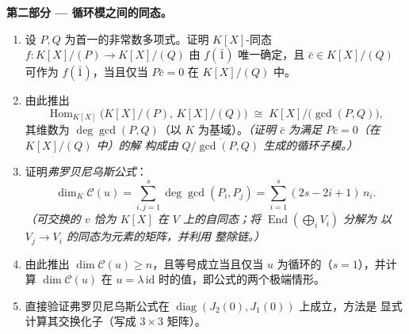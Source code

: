 \begin{problem}
\medskip
\noindent\textbf{第二部分 --- 循环模之间的同态。}
\begin{enumerate}[resume]
  \item 设 $P, Q$ 为首一的非常数多项式。证明
        $K[X]$-同态 $f \colon K[X]/(P) \to K[X]/(Q)$
        由 $f(\bar 1)$ 唯一确定，且 $\bar c \in K[X]/(Q)$
        可作为 $f(\bar 1)$，当且仅当 $P\bar c = 0$ 在 $K[X]/(Q)$ 中。
  \item 由此推出
        \[
        \operatorname{Hom}_{K[X]}\bigl(K[X]/(P),\, K[X]/(Q)\bigr)
        \;\cong\; K[X]\big/\bigl(\gcd(P, Q)\bigr),
        \]
        其维数为 $\deg \gcd(P, Q)$（以 $K$ 为基域）。\emph{（证明
        $\bar c$ 为满足 $P\bar c = 0$（在 $K[X]/(Q)$ 中）的解
        构成由
        $\overline{Q/\gcd(P,Q)}$ 生成的循环子模。）}
  \item 证明\emph{弗罗贝尼乌斯公式}：
        \[
        \dim_K \mathcal C(u) = \sum_{i,j=1}^{s} \deg\gcd(P_i,
        P_j) = \sum_{i=1}^{s} (2s - 2i + 1)\, n_i .
        \]
        \emph{（可交换的 $v$ 恰为 $K[X]$ 在
        $V$ 上的自同态；将 $\operatorname{End}(\bigoplus_i V_i)$ 分解为
        以 $V_j \to V_i$ 的同态为元素的矩阵，并利用
        整除链。）}
  \item 由此推出 $\dim \mathcal C(u) \geq n$，且等号成立当且仅当 $u$
        为循环的（$s = 1$），并计算 $\dim\mathcal C(u)$
        在 $u = \lambda\,\mathrm{id}$ 时的值，即公式的两个极端情形。
  \item 直接验证弗罗贝尼乌斯公式在
        $\operatorname{diag}(J_2(0), J_1(0))$ 上成立，方法是
        显式计算其交换化子（写成 $3\times3$ 矩阵）。
\end{enumerate}


\end{problem}
